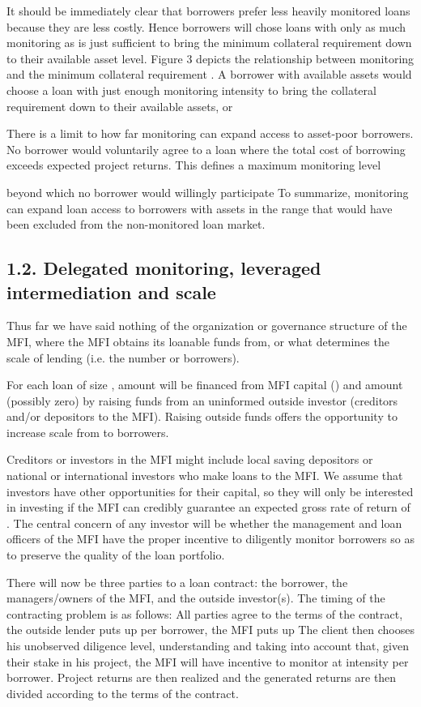 \documentclass{article}
\begin{document}
It should be immediately clear that borrowers prefer less heavily
monitored loans because they are less costly. Hence borrowers will chose
loans with only as much monitoring as is just sufficient to bring the
minimum collateral requirement down to their available asset level.
Figure 3 depicts the relationship between monitoring and the minimum
collateral requirement . A borrower with available assets would choose a
loan with just enough monitoring intensity to bring the collateral
requirement down to their available assets, or

There is a limit to how far monitoring can expand access to asset-poor
borrowers. No borrower would voluntarily agree to a loan where the total
cost of borrowing exceeds expected project returns. This defines a
maximum monitoring level

beyond which no borrower would willingly participate To summarize,
monitoring can expand loan access to borrowers with assets in the range
that would have been excluded from the non-monitored loan market.

\subsection{1.2. Delegated monitoring, leveraged intermediation and
scale}\label{delegated-monitoring-leveraged-intermediation-and-scale}

Thus far we have said nothing of the organization or governance
structure of the MFI, where the MFI obtains its loanable funds from, or
what determines the scale of lending (i.e. the number or borrowers).

For each loan of size , amount will be financed from MFI capital () and
amount (possibly zero) by raising funds from an uninformed outside
investor (creditors and/or depositors to the MFI). Raising outside funds
offers the opportunity to increase scale from to borrowers.

Creditors or investors in the MFI might include local saving depositors
or national or international investors who make loans to the MFI. We
assume that investors have other opportunities for their capital, so
they will only be interested in investing if the MFI can credibly
guarantee an expected gross rate of return of . The central concern of
any investor will be whether the management and loan officers of the MFI
have the proper incentive to diligently monitor borrowers so as to
preserve the quality of the loan portfolio.

There will now be three parties to a loan contract: the borrower, the
managers/owners of the MFI, and the outside investor(s). The timing of
the contracting problem is as follows: All parties agree to the terms of
the contract, the outside lender puts up per borrower, the MFI puts up
The client then chooses his unobserved diligence level, understanding
and taking into account that, given their stake in his project, the MFI
will have incentive to monitor at intensity per borrower. Project
returns are then realized and the generated returns are then divided
according to the terms of the contract.
\end{document}
